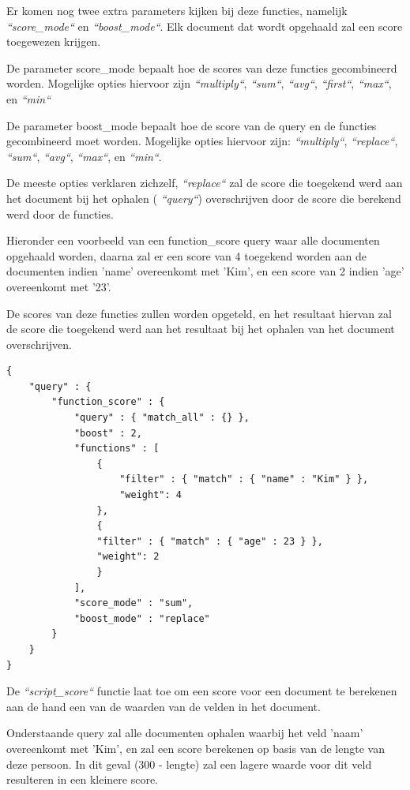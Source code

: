Er komen nog twee extra parameters kijken bij deze functies, namelijk \textit{``score\_mode``} en \textit{``boost\_mode``}. Elk document dat wordt opgehaald zal een score toegewezen krijgen. 

De parameter score\_mode bepaalt hoe de scores  van deze functies gecombineerd worden. Mogelijke opties hiervoor zijn \textit{``multiply``}, \textit{``sum``}, \textit{``avg``}, \textit{``first``}, \textit{``max``}, en \textit{``min``}

De parameter boost\_mode bepaalt hoe de score van de query en de functies gecombineerd moet worden. Mogelijke opties hiervoor zijn: \textit{``multiply``}, \textit{``replace``}, \textit{``sum``}, \textit{``avg``}, \textit{``max``}, en \textit{``min``}.

De meeste opties verklaren zichzelf, \textit{``replace``} zal de score die toegekend werd aan het document bij het ophalen ( \textit{``query``}) overschrijven door de score die berekend werd door de functies. 

Hieronder een voorbeeld van een function\_score query waar alle documenten opgehaald worden, daarna zal er een score van 4 toegekend worden aan de documenten indien 'name' overeenkomt met 'Kim', en een score van 2 indien 'age' overeenkomt met '23'.

De scores van deze functies zullen worden opgeteld, en het resultaat hiervan zal de score die toegekend werd aan het resultaat bij het ophalen van het document overschrijven. 

\newpage
\begin{lstlisting}[caption={Scoring: voorbeeld van een function\_score query}]
{
	"query" : {
		"function_score" : {
			"query" : { "match_all" : {} },
			"boost" : 2,
			"functions" : [
				{
					"filter" : { "match" : { "name" : "Kim" } },
					"weight": 4
				},
				{
				"filter" : { "match" : { "age" : 23 } },
				"weight": 2
				}
			],
			"score_mode" : "sum",
			"boost_mode" : "replace"
		}
	}
}
\end{lstlisting}

De \textit{``script\_score``} functie laat toe om een score voor een document te berekenen aan de hand een van de waarden van de velden in het document.

Onderstaande query zal alle documenten ophalen waarbij het veld 'naam' overeenkomt met 'Kim', en zal een score berekenen op basis van de lengte van deze persoon. In dit geval (300 - lengte) zal een lagere waarde voor dit veld resulteren in een kleinere score.

